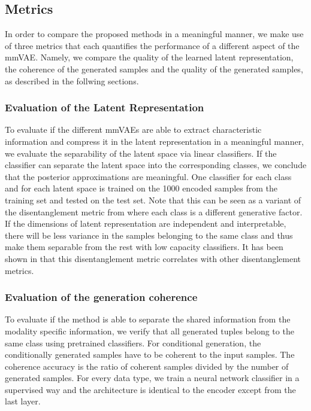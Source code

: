 \subsection{Metrics}
In order to compare the proposed methods in a meaningful manner, we make use of three metrics that each quantifies the performance of a different aspect of the mmVAE.
Namely, we compare the quality of the learned latent representation, the coherence of the generated samples and the quality of the generated samples, as described in the follwing sections.

\subsubsection{Evaluation of the Latent Representation}
To evaluate if the different mmVAEs are able to extract characteristic information and compress it in the latent representation in a meaningful manner, we evaluate the separability of the latent space via linear classifiers.
If the classifier can separate the latent space into the corresponding classes, we conclude that the posterior approximations are meaningful.
One classifier for each class and for each latent space is trained on the 1000 encoded samples from the training set and tested on the test set.
Note that this can be seen as a variant of the disentanglement metric from \cite{beta_vae} where each class is a different generative factor.
If the dimensions of latent representation are independent and interpretable, there will be less variance in the samples belonging to the same class and thus make them separable from the rest with low capacity classifiers.
It has been shown in \cite{locatello_challenging_2019} that this disentanglement metric correlates with other disentanglement metrics.

\subsubsection{Evaluation of the generation coherence}
\label{subsubsec:gen_coh}
To evaluate if the method is able to separate the shared information from the modality specific information, we verify that all generated tuples belong to the same class using pretrained classifiers.
For conditional generation, the conditionally generated samples have to be coherent to the input samples.
The coherence accuracy is the ratio of coherent samples divided by the number of generated samples.
For every data type, we train a neural network classifier in a supervised way and the architecture is identical to the encoder except from the last layer.

